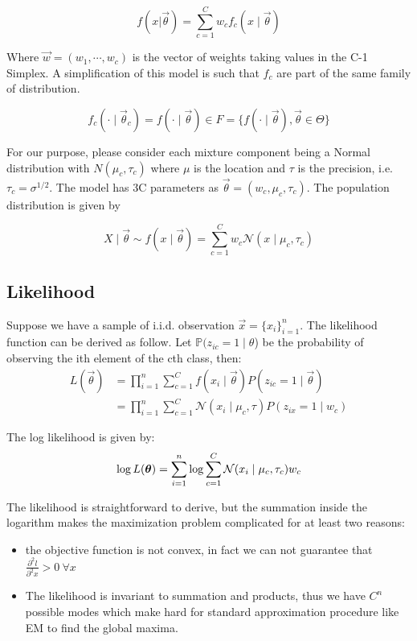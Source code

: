 \documentclass{article}
\begin{document}
\begin{equation}
f(x|\vec \theta) = \sum_{c = 1}^C w_c f_c(x \mid \vec \theta)
\end{equation}

Where $\vec w = (w_1,\cdots , w_c)$ is the vector of weights taking values in the C-1 Simplex. A simplification of this model is such that $f_c$ are part of the same family of distribution.

\begin{equation}
f_c (\cdot \mid \vec \theta_c) = f( \cdot \mid \vec \theta) \in  F = \{f(\cdot \mid \vec \theta), \vec \theta \in \Theta \}
\end{equation}

For our purpose, please consider each mixture component being a Normal distribution with $N(\mu_c, \tau_c)$ where $\mu$ is the location and $\tau$ is the precision, i.e. $\tau_c = \sigma^{1/2}$. The model has 3C parameters as  $\vec \theta = (w_c, \mu_c, \tau_c)$. The population distribution is given by

\begin{equation}
X \mid \vec \theta \sim f(x \mid  \vec \theta)  = \sum_{c = 1}^C w_c \mathcal{N}(x \mid \mu_c,\tau_c)
\end{equation}

\subsection{Likelihood}
Suppose we have a sample of i.i.d. observation $\vec x = \{x_i\}_{i=1}^n$. The likelihood function can be derived as follow. Let $\mathbb{P}(z_{ic} = 1 \mid \theta$) be the probability of observing the ith element of the cth class, then:
\begin{equation}
\begin{split}
L(\vec \theta) &= \prod_{i=1}^n  \sum_{c=1}^C f(x_i \mid \vec\theta) P(z_{ic} = 1 \mid \vec \theta ) \\
&= \prod_{i=1}^n \sum_{c=1}^C \mathcal{N}(x_i \mid \mu_c, \tau) P(z_{ix} = 1 \mid w_{c})
\end{split}
\end{equation}

The log likelihood is given by:
\begin{equation}
\log L(\boldsymbol{\theta})  = \sum_{i=1}^n \log \sum_{c=1}^C \mathcal{N}(x_i \mid \mu_c, \tau_c) w_{c}
\end{equation}

The likelihood is straightforward to derive, but the summation inside the logarithm makes the maximization problem complicated for at least two reasons:
\begin{itemize}
\item the objective function is not convex, in fact we can not guarantee that $\frac{\partial^2 l}{\partial^2 x} > 0 \ \forall x$
\item The likelihood is invariant to summation and products, thus we have $C^n$ possible modes which make hard for standard approximation procedure like EM to find the global maxima.
\end{itemize}
\end{document}
